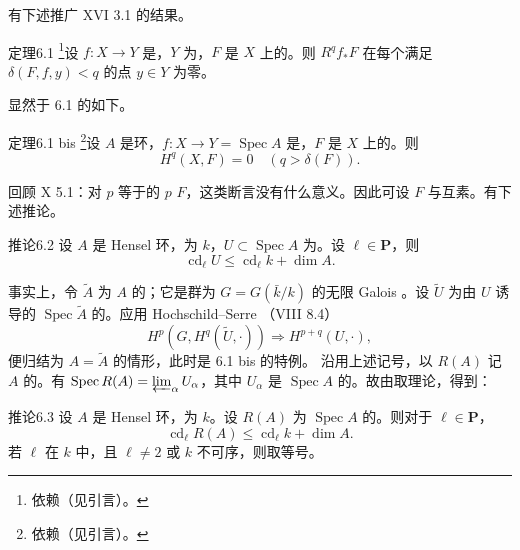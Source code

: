 有下述推广 XVI 3.1 的结果。
\begin{SGAresult}{定理}{6.1}
\footnote{依赖（见引言）。}设 $f:X\to Y$ 是，$Y$ 为，$F$ 是 $X$ 上的。则 $R^qf_*F$ 在每个满足 $\delta(F,f,y)<q$ 的点 $y\in Y$ 为零。
\end{SGAresult}
显然于 6.1 的如下。
\begin{SGAresult}{定理}{6.1 bis}
\footnote{依赖（见引言）。}设 $A$ 是环，$f:X\to Y=\operatorname{Spec}A$ 是，$F$ 是 $X$ 上的。则
\[H^q(X,F)=0\quad(q>\delta(F)).\]
\end{SGAresult}
回顾 X 5.1：对 $p$ 等于的 $p$  $F$，这类断言没有什么意义。因此可设 $F$ 与互素。有下述推论。
\begin{SGAresult}{推论}{6.2}
设 $A$ 是 Hensel 环，为 $k$，$U\subset\operatorname{Spec}A$ 为。设 $\ell\in\mathbf P$，则
\[\operatorname{cd}_\ell U\le\operatorname{cd}_\ell k+\dim A.\]
\end{SGAresult}
事实上，令 $\widetilde A$ 为 $A$ 的；它是群为 $G=G(\bar k/k)$ 的无限 Galois 。设 $\widetilde U$ 为由 $U$ 诱导的 $\operatorname{Spec}\widetilde A$ 的。应用 Hochschild--Serre （VIII 8.4）
\[H^p(G,H^q(\widetilde U,\cdot))\Longrightarrow H^{p+q}(U,\cdot),\]
便归结为 $A=\widetilde A$ 的情形，此时是 6.1 bis 的特例。
沿用上述记号，以 $R(A)$ 记 $A$ 的。有 $\operatorname{Spec}R(A)=\varprojlim_\alpha U_\alpha$，其中 $U_\alpha$ 是 $\operatorname{Spec}A$ 的。故由取理论，得到：
\begin{SGAresult}{推论}{6.3}
设 $A$ 是 Hensel 环，为 $k$。设 $R(A)$ 为 $\operatorname{Spec}A$ 的。则对于 $\ell\in\mathbf P$，
\[\operatorname{cd}_\ell R(A)\le\operatorname{cd}_\ell k+\dim A.\]
若 $\ell$ 在 $k$ 中，且 $\ell\ne2$ 或 $k$ 不可序，则取等号。
\end{SGAresult}
